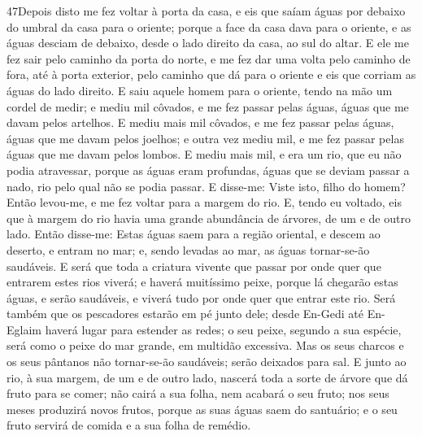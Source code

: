 \lettrine{47} Depois disto me fez voltar à porta da casa, e
eis que saíam águas por debaixo do umbral da casa para o oriente;
porque a face da casa dava para o oriente, e as águas desciam de
debaixo, desde o lado direito da casa, ao sul do altar. E ele me
fez sair pelo caminho da porta do norte, e me fez dar uma volta pelo
caminho de fora, até à porta exterior, pelo caminho que dá para o
oriente e eis que corriam as águas do lado direito. E saiu
aquele homem para o oriente, tendo na mão um cordel de medir; e
mediu mil côvados, e me fez passar pelas águas, águas que me davam
pelos artelhos. E mediu mais mil côvados, e me fez passar pelas
águas, águas que me davam pelos joelhos; e outra vez mediu mil, e me
fez passar pelas águas que me davam pelos lombos. E mediu mais
mil, e era um rio, que eu não podia atravessar, porque as águas eram
profundas, águas que se deviam passar a nado, rio pelo qual não se
podia passar. E disse-me: Viste isto, filho do homem? Então
levou-me, e me fez voltar para a margem do rio. E, tendo eu
voltado, eis que à margem do rio havia uma grande abundância de
árvores, de um e de outro lado. Então disse-me: Estas águas saem
para a região oriental, e descem ao deserto, e entram no mar; e,
sendo levadas ao mar, as águas tornar-se-ão saudáveis. E será
que toda a criatura vivente que passar por onde quer que entrarem
estes rios viverá; e haverá muitíssimo peixe, porque lá chegarão
estas águas, e serão saudáveis, e viverá tudo por onde quer que
entrar este rio. Será também que os pescadores estarão em pé
junto dele; desde En-Gedi até En-Eglaim haverá lugar para estender
as redes; o seu peixe, segundo a sua espécie, será como o peixe do
mar grande, em multidão excessiva. Mas os seus charcos e os
seus pântanos não tornar-se-ão saudáveis; serão deixados para sal.
E junto ao rio, à sua margem, de um e de outro lado, nascerá
toda a sorte de árvore que dá fruto para se comer; não cairá a sua
folha, nem acabará o seu fruto; nos seus meses produzirá novos
frutos, porque as suas águas saem do santuário; e o seu fruto
servirá de comida e a sua folha de remédio.

